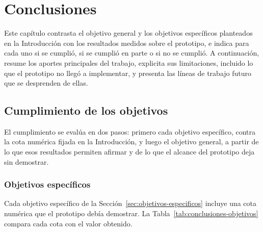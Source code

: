 \chapter{Conclusiones}
\label{cha:conclusiones}

Este capítulo contrasta el objetivo general y los objetivos específicos planteados en la Introducción con los resultados medidos sobre el prototipo, e indica para cada uno si se cumplió, si se cumplió en parte o si no se cumplió. A continuación, resume los aportes principales del trabajo, explicita sus limitaciones, incluido lo que el prototipo no llegó a implementar, y presenta las líneas de trabajo futuro que se desprenden de ellas.

\section{Cumplimiento de los objetivos}
\label{sec:conclusiones-objetivos}

El cumplimiento se evalúa en dos pasos: primero cada objetivo específico, contra la cota numérica fijada en la Introducción, y luego el objetivo general, a partir de lo que esos resultados permiten afirmar y de lo que el alcance del prototipo deja sin demostrar.

\subsection{Objetivos específicos}
\label{sec:conclusiones-especificos}

Cada objetivo específico de la Sección~\ref{sec:objetivos-especificos} incluye una cota numérica que el prototipo debía demostrar. La Tabla~\ref{tab:conclusiones-objetivos} compara cada cota con el valor obtenido.

